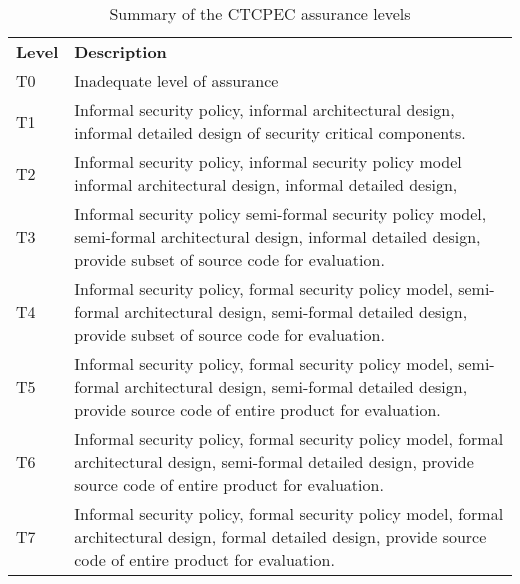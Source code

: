     \begin{table}[H]
        \begin{center}
         \begin{tabular}{|>{\sffamily}p{1cm}|>{\sffamily}p{12cm}|} \hline
            \multicolumn{2}{|c|}{\bfseries{\sffamily{CTCPEC}}} \\ \hline
            \bfseries{Level} & \bfseries{Description} \\ \hline
            T0 & Inadequate level of assurance
                 \\ \hline
            T1 & Informal security policy, 
                 informal architectural design,
                 informal detailed design of security critical components.
                 \\ \hline
            T2 & Informal security policy, 
                 informal security policy model 
                 informal architectural design, 
                 informal detailed design, 
                 \\ \hline
            T3 & Informal security policy
                 semi-formal security policy model,
                 semi-formal architectural design, 
                 informal detailed design,
                 provide subset of source code for evaluation.
                 \\ \hline
            T4 & Informal security policy,
                 formal security policy model,
                 semi-formal architectural design,
                 semi-formal detailed design,
                 provide subset of source code for evaluation.
                 \\ \hline
            T5 & Informal security policy,
                 formal security policy model,
                 semi-formal architectural design,
                 semi-formal detailed design,
                 provide source code of entire product for evaluation.
                 \\ \hline
            T6 & Informal security policy,
                 formal security policy model,
                 formal architectural design,
                 semi-formal detailed design,
                 provide source code of entire product for evaluation.
                 \\ \hline
            T7 & Informal security policy,
                 formal security policy model,
                 formal architectural design,
                 formal detailed design,
                 provide source code of entire product for evaluation.
                 \\ \hline
        \end{tabular}
        \end{center}
    \caption{Summary of the CTCPEC assurance levels} \label{table:ctcpec-levels}
    \end{table}

